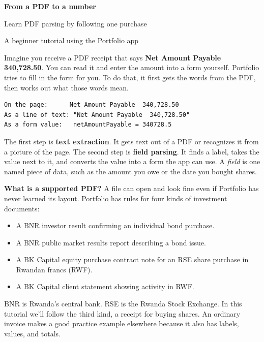 \documentclass[11pt,a4paper]{article}
\begin{document}
    \raggedright
    \vspace*{9mm}
    {\Huge\bfseries\color{ink} From a PDF to a number}\par
    \medskip
    {\Large Learn PDF parsing by following one purchase}\par
    \medskip
    {\small A beginner tutorial using the Portfolio app}
    \vspace{5mm}

    Imagine you receive a PDF receipt that says \textbf{Net Amount Payable 340,728.50}. You can read it and enter the amount into a form yourself. Portfolio tries to fill in the form for you. To do that, it first gets the words from the PDF, then works out what those words mean.

    \begin{lstlisting}
On the page:      Net Amount Payable  340,728.50
As a line of text: "Net Amount Payable  340,728.50"
As a form value:   netAmountPayable = 340728.5
    \end{lstlisting}

    The first step is \textbf{text extraction}. It gets text out of a PDF or recognizes it from a picture of the page. The second step is \textbf{field parsing}. It finds a label, takes the value next to it, and converts the value into a form the app can use. A \emph{field} is one named piece of data, such as the amount you owe or the date you bought shares.

    \textbf{What is a supported PDF?} A file can open and look fine even if Portfolio has never learned its layout. Portfolio has rules for four kinds of investment documents:

    \begin{itemize}
        \item A BNR investor result confirming an individual bond purchase.
        \item A BNR public market results report describing a bond issue.
        \item A BK Capital equity purchase contract note for an RSE share purchase in Rwandan francs (RWF).
        \item A BK Capital client statement showing activity in RWF.
    \end{itemize}

    BNR is Rwanda's central bank. RSE is the Rwanda Stock Exchange. In this tutorial we'll follow the third kind, a receipt for buying shares. An ordinary invoice makes a good practice example elsewhere because it also has labels, values, and totals.
\end{document}
